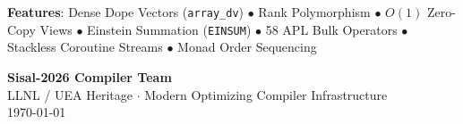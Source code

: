 \begin{titlepage}
    \vfill
    
    \begin{tcolorbox}[colback=sisalnavy!5!white,colframe=sisalnavy,arc=3mm,center]
        \centering
        \textbf{Features}: Dense Dope Vectors (\texttt{array\_dv}) $\bullet$ Rank Polymorphism $\bullet$ $O(1)$ Zero-Copy Views $\bullet$ Einstein Summation (\texttt{EINSUM}) $\bullet$ 58 APL Bulk Operators $\bullet$ Stackless Coroutine Streams $\bullet$ Monad Order Sequencing
    \end{tcolorbox}
    
    \vspace{1cm}
    
    {\large \textbf{Sisal-2026 Compiler Team}} \\[0.2cm]
    {\small LLNL / UEA Heritage $\cdot$ Modern Optimizing Compiler Infrastructure} \\[0.2cm]
    {\small \today}
    
\end{titlepage}
